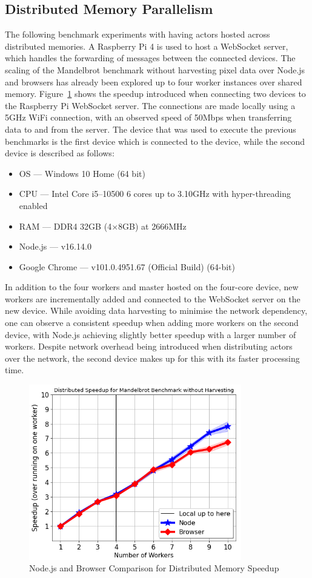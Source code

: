 \documentclass[oneside]{um-fict}
\begin{document}
\subsection{Distributed Memory Parallelism}
The following benchmark experiments with having actors hosted across distributed memories. A Raspberry Pi 4 is used to host a WebSocket server, which handles the forwarding of messages between the connected devices. The scaling of the Mandelbrot benchmark without harvesting pixel data over Node.js and browsers has already been explored up to four worker instances over shared memory. Figure~\ref{fig:distributed_memory_speedup} shows the speedup introduced when connecting two devices to the Raspberry Pi WebSocket server. The connections are made locally using a 5GHz WiFi connection, with an observed speed of 50Mbps when transferring data to and from the server. The device that was used to execute the previous benchmarks is the first device which is connected to the device, while the second device is described as follows: 
\begin{itemize}
    \item OS --- Windows 10 Home (64 bit)
    \item CPU --- Intel Core i5--10500 6 cores up to 3.10GHz with hyper-threading enabled
    \item RAM --- DDR4 32GB (4$\times$8GB) at 2666MHz
    \item Node.js --- v16.14.0
    \item Google Chrome --- v101.0.4951.67 (Official Build) (64-bit)
\end{itemize}
In addition to the four workers and master hosted on the four-core device, new workers are incrementally added and connected to the WebSocket server on the new device. While avoiding data harvesting to minimise the network dependency, one can observe a consistent speedup when adding more workers on the second device, with Node.js achieving slightly better speedup with a larger number of workers. Despite network overhead being introduced when distributing actors over the network, the second device makes up for this with its faster processing time.
\begin{figure}[H]
    \begin{centering}
        \includegraphics[width=350px]{resources/distributed_memory_speedup.png}
        \caption{Node.js and Browser Comparison for Distributed Memory Speedup}\label{fig:distributed_memory_speedup}
    \end{centering}
\end{figure}
\end{document}
